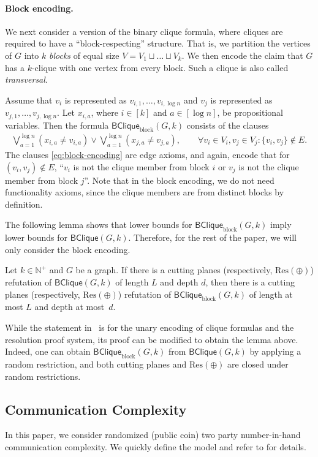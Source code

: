 \documentclass[10pt,a4paper]{article}
\theoremstyle{definition}
\theoremstyle{remark}
\theoremstyle{example}
\theoremstyle{plain}
\newcommand{\ResLin}{\textrm{Res}(\oplus)}
\newcommand{\binClique}[2]{\mathsf{BClique}({#1}, {#2})}
\newcommand{\binCliqueGk}{\binClique{G}{k}}
\newcommand{\binCliqueBlock}[2]{\mathsf{BClique}_{\textrm{block}}({#1}, {#2})}
\newcommand{\binCliqueBlockGk}{\binCliqueBlock{G}{k}}
\newcommand{\myparagraph}[1]{\paragraph{#1}}
\begin{document}
\myparagraph{Block encoding.} 
We next consider a version of the binary clique formula, where cliques are required to have a ``block-respecting'' structure. 
That is, we partition the vertices of $G$ into $k$ \emph{blocks} of equal size $V=V_1 \sqcup \dots \sqcup V_k$.
We then encode the claim that $G$ has a $k$-clique with one vertex from every block. Such a clique is also called \emph{transversal}.

Assume that $v_i$ is represented as 
$v_{i,1}, \dots, v_{i, \log n}$ and $v_j$ is represented as 
$v_{j,1}, \dots, v_{j, \log n}$. Let $x_{i,a}$, where $i\in [k]$ and $a \in [\log n]$, be propositional variables. Then the formula $\binCliqueBlock{G}{k}$ consists of the clauses
\begin{align}
    \bigvee_{a=1}^{\log n} (x_{i,a}\neq v_{i,a}) \lor  \bigvee_{a=1}^{\log n} (x_{j,a}\neq v_{j,a}), 
    \qquad \forall v_i\in V_i, v_j \in V_j: \{v_i,v_j\}\notin E.
    \label{eq:block-encoding}
\end{align}
The clauses \eqref{eq:block-encoding} are edge axioms, and again, encode that for $(v_i,v_j)\notin E$, ``$v_i$ is not the clique member from block $i$ or $v_j$ is not the clique member from block $j$''.
Note that in the block encoding, we do not need functionality axioms, since the clique members are from distinct blocks by definition.

The following lemma shows that lower bounds for $\binCliqueBlockGk$ imply lower bounds for $\binCliqueGk$. Therefore, for the rest of the paper, we will only consider the block encoding.
\begin{lemma}\label{lem:blockToBinary}
    Let $k\in \mathbb{N}^+$ and $G$ be a graph. 
    If there is a cutting planes (respectively, $\ResLin$) refutation of $\binCliqueGk$ of length $L$ and depth $d$, then there is a cutting planes (respectively, $\ResLin$) refutation of $\binCliqueBlockGk$ of length at most $L$ and depth at most~$d$. 
\end{lemma}
While the statement in~\cite{BIS07IndependentSets} is for the unary encoding of clique formulas and the resolution proof system, its proof can be modified to obtain the lemma above. 
Indeed, 
one can obtain $\binCliqueBlockGk$ from $\binCliqueGk$ by applying a random restriction, and both cutting planes and $\ResLin
$ are closed under random restrictions.

\subsection{Communication Complexity}
In this paper, we consider randomized (public coin)
two party
number-in-hand communication complexity. 
We quickly define the model and refer to \cite{KN97CommunicationCplx,RY20CommunicationCplx} for details.
\end{document}
